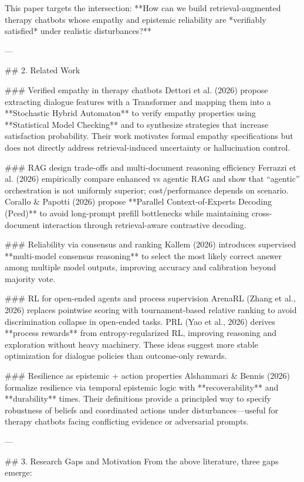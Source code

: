 This paper targets the intersection: **How can we build retrieval-augmented therapy chatbots whose empathy and epistemic reliability are *verifiably satisfied* under realistic disturbances?**

---

## 2. Related Work  

### Verified empathy in therapy chatbots  
Dettori et al. (2026) propose extracting dialogue features with a Transformer and mapping them into a **Stochastic Hybrid Automaton** to verify empathy properties using **Statistical Model Checking** and to synthesize strategies that increase satisfaction probability. Their work motivates formal empathy specifications but does not directly address retrieval-induced uncertainty or hallucination control.

### RAG design trade-offs and multi-document reasoning efficiency  
Ferrazzi et al. (2026) empirically compare enhanced vs agentic RAG and show that “agentic” orchestration is not uniformly superior; cost/performance depends on scenario. Corallo & Papotti (2026) propose **Parallel Context-of-Experts Decoding (Pced)** to avoid long-prompt prefill bottlenecks while maintaining cross-document interaction through retrieval-aware contrastive decoding.

### Reliability via consensus and ranking  
Kallem (2026) introduces supervised **multi-model consensus reasoning** to select the most likely correct answer among multiple model outputs, improving accuracy and calibration beyond majority vote.

### RL for open-ended agents and process supervision  
ArenaRL (Zhang et al., 2026) replaces pointwise scoring with tournament-based relative ranking to avoid discrimination collapse in open-ended tasks. PRL (Yao et al., 2026) derives **process rewards** from entropy-regularized RL, improving reasoning and exploration without heavy machinery. These ideas suggest more stable optimization for dialogue policies than outcome-only rewards.

### Resilience as epistemic + action properties  
Alshammari & Bennis (2026) formalize resilience via temporal epistemic logic with **recoverability** and **durability** times. Their definitions provide a principled way to specify robustness of beliefs and coordinated actions under disturbances—useful for therapy chatbots facing conflicting evidence or adversarial prompts.

---

## 3. Research Gaps and Motivation  
From the above literature, three gaps emerge:

